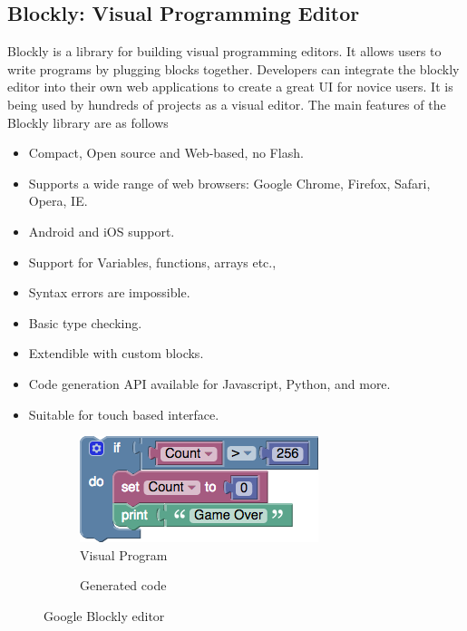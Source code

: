 \subsection{Blockly: Visual Programming Editor}
Blockly \cite{Blockly} is a library for building visual programming editors. It allows users to write programs by plugging blocks together. Developers can integrate the blockly editor into their own web applications to create a great UI for novice users. It is being used by hundreds of projects as a visual editor. The main features of the Blockly library are as follows

\begin{itemize}
\item Compact, Open source and Web-based, no Flash.
\item Supports a wide range of web browsers: Google Chrome, Firefox, Safari, Opera, IE.
\item Android and iOS support.
\item Support for Variables, functions, arrays etc.,
\item Syntax errors are impossible.
\item Basic type checking.
\item Extendible with custom blocks.
\item Code generation API available for Javascript, Python, and more.
\item Suitable for touch based interface.
\end{itemize}

\begin{figure}[H]
\begin{subfigure}[h]{0.48\textwidth}
\includegraphics[width=\textwidth]{assets/blockly_sample.png}
\caption[Visual Program]{Visual Program}
\label{fig:blockly_sample}
\end{subfigure}
\hfill
\begin{subfigure}[h]{0.48\textwidth}

\caption[Generated code]{Generated code}
\label{fig:blockly_sample_code}
\end{subfigure}
\caption[Google Blockly editor]{Google Blockly editor}
\label{fig:pseudo_nodes}
\end{figure}

